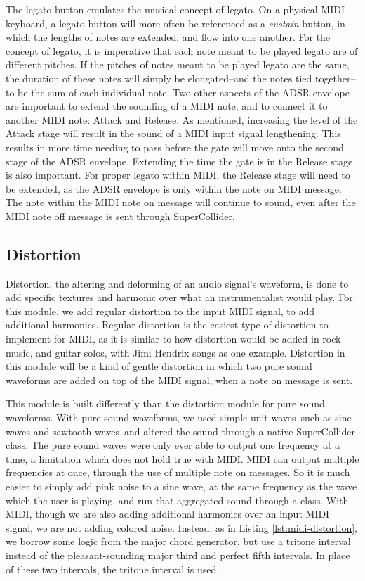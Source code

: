 The legato button emulates the musical concept of legato. On a physical MIDI keyboard, a legato button will more often be referenced as a \textit{sustain} button, in which the lengths of notes are extended, and flow into one another. For the concept of legato, it is imperative that each note meant to be played legato are of different pitches. If the pitches of notes meant to be played legato are the same, the duration of these notes will simply be elongated--and the notes tied together--to be the sum of each individual note. Two other aspects of the ADSR envelope are important to extend the sounding of a MIDI note, and to connect it to another MIDI note: Attack and Release. As mentioned, increasing the level of the Attack stage will result in the sound of a MIDI input signal lengthening. This results in more time needing to pass before the gate will move onto the second stage of the ADSR envelope. Extending the time the gate is in the Release stage is also important. For proper legato within MIDI, the Release stage will need to be extended, as the ADSR envelope is only within the note on MIDI message. The note within the MIDI note on message will continue to sound, even after the MIDI note off message is sent through SuperCollider.


\subsection{Distortion}

Distortion, the altering and deforming of an audio signal's waveform, is done to add specific textures and harmonic over what an instrumentalist would play. For this module, we add regular distortion to the input MIDI signal, to add additional harmonics. Regular distortion is the easiest type of distortion to implement for MIDI, as it is similar to how distortion would be added in rock music, and guitar solos, with Jimi Hendrix songs as one example. Distortion in this module will be a kind of gentle distortion in which two pure sound waveforms are added on top of the MIDI signal, when a note on message is sent. 

This module is built differently than the distortion module for pure sound waveforms. With pure sound waveforms, we used simple unit waves--such as sine waves and sawtooth waves--and altered the sound through a native SuperCollider class. The pure sound waves were only ever able to output one frequency at a time, a limitation which does not hold true with MIDI. MIDI can output multiple frequencies at once, through the use of multiple note on messages. So it is much easier to simply add pink noise to a sine wave, at the same frequency as the wave which the user is playing, and run that aggregated sound through a class. With MIDI, though we are also adding additional harmonics over an input MIDI signal, we are not adding colored noise. Instead, as in Listing \ref{lst:midi-distortion}, we borrow some logic from the major chord generator, but use a tritone interval instead of the pleasant-sounding major third and perfect fifth intervals. In place of these two intervals, the tritone interval is used. 

